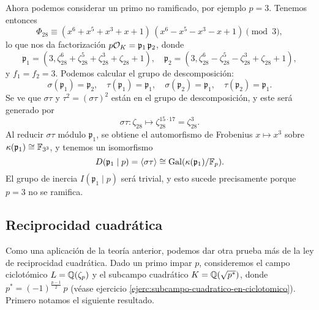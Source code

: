 \begin{ejemplo}
  Ahora podemos considerar un primo no ramificado, por ejemplo $p = 3$.
  Tenemos entonces
  $$\Phi_{28} \equiv (x^6 + x^5 + x^3 + x + 1)\,(x^6 - x^5 - x^3 - x + 1) \pmod{3},$$
  lo que nos da factorización $p\mathcal{O}_K = \mathfrak{p}_1\,\mathfrak{p}_2$, donde
  \[ \mathfrak{p}_1 = (3, \zeta_{28}^6 + \zeta_{28}^5 + \zeta_{28}^3 + \zeta_{28} + 1), \quad
     \mathfrak{p}_2 = (3, \zeta_{28}^6 - \zeta_{28}^5 - \zeta_{28}^3 + \zeta_{28} + 1), \]
  y
  $f_1 = f_2 = 3$. Podemos calcular el grupo de descomposición:
  \[ \sigma (\mathfrak{p}_1) = \mathfrak{p}_2, \quad
     \tau (\mathfrak{p}_1) = \mathfrak{p}_1, \quad
     \sigma (\mathfrak{p}_2) = \mathfrak{p}_1, \quad
     \tau (\mathfrak{p}_2) = \mathfrak{p}_1. \]
  Se ve que $\sigma\tau$ y $\tau^2 = (\sigma\tau)^2$ están en el grupo de
  descomposición, y este será generado por
  $$\sigma\tau\colon \zeta_{28} \mapsto \zeta_{28}^{15\cdot 17} = \zeta_{28}^3.$$
  Al reducir $\sigma\tau$ módulo $\mathfrak{p}_1$, se obtiene el automorfismo
  de Frobenius $x \mapsto x^3$ sobre $\kappa (\mathfrak{p}_1) \cong \mathbb{F}_{3^3}$,
  y tenemos un isomorfismo
  \[ D (\mathfrak{p}_1\mid p) = \langle\sigma\tau\rangle
     \cong \operatorname{Gal} (\kappa (\mathfrak{p}_1)/\mathbb{F}_p). \]
  El grupo de inercia $I (\mathfrak{p}_1\mid p)$ será trivial, y esto sucede
  precisamente porque $p = 3$ no se ramifica.
\end{ejemplo}

\subsection{Reciprocidad cuadrática}

Como una aplicación de la teoría anterior, podemos dar otra prueba más de
la ley de reciprocidad cuadrática. Dado un primo impar $p$, consideremos
el campo ciclotómico $L = \mathbb{Q} (\zeta_p)$ y el subcampo cuadrático
$K = \mathbb{Q} (\sqrt{p^*})$, donde $p^* = (-1)^{\frac{p-1}{2}}\,p$
(véase ejercicio \ref{ejerc:subcampo-cuadratico-en-ciclotomico}).
Primero notamos el siguiente resultado.

